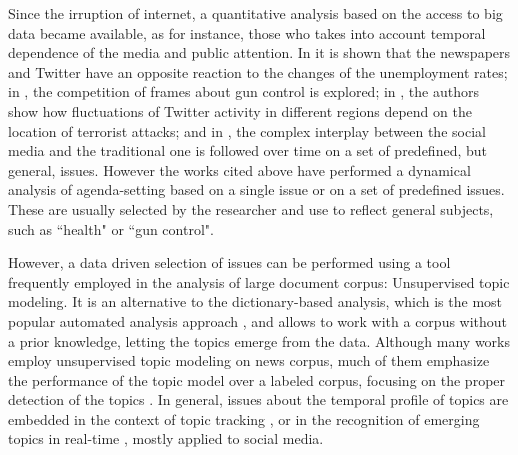 \documentclass{bmcart}
\begin{document}

\par Since the irruption of internet, a quantitative analysis based on  the access to big data became available, as for instance, those who takes into account  temporal dependence of the media and public attention. 
In \cite{soroka2017negativity} it is shown that the newspapers and Twitter have an opposite reaction to the changes of the unemployment rates; in \cite{guggenheim2015dynamics}, the competition of frames about gun control is explored; in \cite{ali2018measuring}, the authors show how fluctuations of Twitter activity in different regions depend on the location of terrorist attacks; and in \cite{russell2014dynamics}, the complex interplay between the social media and the traditional one is followed over time on a set of predefined, but general, issues.
However the works cited above have performed a dynamical analysis of agenda-setting based on a single issue or on a set of predefined issues. These are usually  selected by the researcher and use to reflect general subjects, such as ``health" or ``gun control".


\par However, a data driven selection of issues can be performed using a tool frequently employed in the analysis of large document corpus: Unsupervised topic modeling. 
It is an alternative to the dictionary-based analysis, which is the most popular automated analysis approach \cite{guo2016big}, and allows to work with a corpus without a prior knowledge, letting the topics emerge from the data. 
Although many works employ unsupervised topic modeling on news corpus, much of them emphasize the performance of the topic model over a labeled corpus, focusing on the proper detection of the topics \cite{dai2010online, po2016topic, brun2000experiment}. 
In general, issues about the temporal profile of topics are embedded in the context of topic tracking \cite{hu2016news, li2017joint}, or in the recognition of emerging topics in real-time \cite{cataldi2010emerging}, mostly applied to social media. 
\end{document}
